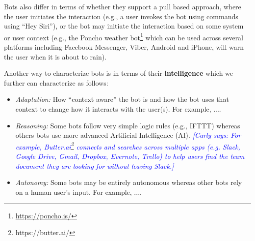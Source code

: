 \documentclass{sig-alternate}
\newcommand{\cl}[1]{\textcolor{blue}{{\it [Carly says: #1]}}}
\begin{document}
Bots also differ in terms of whether they support a pull based approach, where the user initiates the interaction (e.g., a user invokes the bot using commands using ``Hey Siri''), or the bot may initiate the interaction based on some system or user context (e.g., the Poncho weather bot\footnote{\url{https://poncho.is/}} which can be used across several platforms including Facebook Messenger, Viber, Android and iPhone, will warn the user when it is about to rain). 

Another way to characterize bots is in terms of their \textbf{intelligence} which we further can characterize as follows:
\begin{itemize}
\item \emph{Adaptation:} How ``context aware'' the bot is and how the bot uses that context to change how it interacts with the user(s).  For example, ....
\item \emph{Reasoning:} Some bots follow very simple logic rules (e.g., IFTTT) whereas others bots use more advanced Artificial Intelligence (AI).  \cl{For example, Butter.ai\footnote{https://butter.ai/} connects and searches across multiple apps (e.g. Slack, Google Drive, Gmail, Dropbox, Evernote, Trello) to help users find the team document they are looking for without leaving Slack.}
\item \emph{Autonomy:}  Some bots may be entirely autonomous whereas other bots rely on a human user's input.  For example, ....
\end{itemize}
\end{document}
